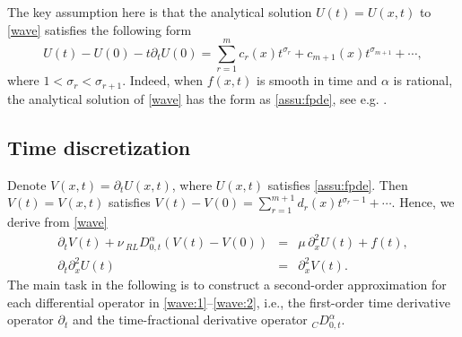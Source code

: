 \documentclass[10pt]{siamltex}
\newtheorem{assu}[thm]{Assumption}
\newcommand{\px}[1][x]{\partial_{#1}}
\begin{document}
The key assumption here is that the analytical solution $U(t)=U(x,t)$
to \eqref{wave} satisfies the following form
\begin{equation}\label{assu:fpde}
U(t)-U(0)-t\px[t]U(0)=\sum_{r=1}^{m}c_r(x)t^{\sigma_r}+ c_{m+1}(x)t^{\sigma_{m+1}}+\cdots,
\end{equation}
where $1<\sigma_r<\sigma_{r+1}$. Indeed, when $f(x,t)$ is smooth in time and $\alpha$ is rational,
the analytical solution of \eqref{wave} has the form as \eqref{assu:fpde},
see e.g. \cite{Diethelm-B10}.



\subsection{Time discretization}
Denote  $V(x,t)=\px[t]U(x,t)$, where $U(x,t)$ satisfies \eqref{assu:fpde}.
Then $V(t)=V(x,t)$ satisfies
$V(t)-V(0)=\sum_{r=1}^{m+1}d_r(x) t^{\sigma_r-1}+\cdots.$
Hence, we derive from \eqref{wave}
\begin{eqnarray}
\px[t]V(t)+\nu\,{}_{RL}D_{0,t}^{\alpha}(V(t)-V(0))&=&\mu\,\px^2 U(t)+f(t),\label{wave:1}\\
\px[t]\px^2 U(t)&=&\px^2 V(t).\label{wave:2}
\end{eqnarray}
The main task in the following is to construct a second-order approximation for
each differential operator in \eqref{wave:1}--\eqref{wave:2}, i.e.,
the first-order time derivative operator $\px[t]$
and the time-fractional derivative operator ${}_CD_{0,t}^{\alpha}$.
\end{document}
